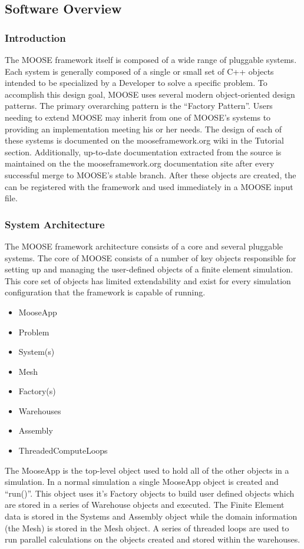 \documentclass{INLreport}
\begin{document}
\subsection{Software Overview}

\subsubsection{Introduction}
The MOOSE framework itself is composed of a wide range of pluggable systems. Each system is generally composed of a
single or small set of C++ objects intended to be specialized by a Developer to solve a specific problem. To accomplish
this design goal, MOOSE uses several modern object-oriented design patterns. The primary overarching pattern is the
``Factory Pattern''. Users needing to extend MOOSE may inherit from one of MOOSE's systems to providing an implementation
meeting his or her needs. The design of each of these systems is documented on the mooseframework.org wiki in the Tutorial
section. Additionally, up-to-date documentation extracted from the source is maintained on the the mooseframework.org
documentation site after every successful merge to MOOSE's stable branch. After these objects are created, the can be
registered with the framework and used immediately in a MOOSE input file.

\subsubsection{System Architecture}
The MOOSE framework architecture consists of a core and several pluggable systems. The core of MOOSE consists of a number
of key objects responsible for setting up and managing the user-defined objects of a finite element simulation. This core
set of objects has limited extendability and exist for every simulation configuration that the framework is capable of running.

\begin{itemize}
\item MooseApp
\item Problem
\item System(s)
\item Mesh
\item Factory(s)
\item Warehouses
\item Assembly
\item ThreadedComputeLoops
\end{itemize}

The MooseApp is the top-level object used to hold all of the other objects in a simulation. In a normal simulation a single
MooseApp object is created and ``run()''. This object uses it's Factory objects to build user defined objects which are stored
in a series of Warehouse objects and executed. The Finite Element data is stored in the Systems and Assembly object while the
domain information (the Mesh) is stored in the Mesh object. A series of threaded loops are used to run parallel calculations
on the objects created and stored within the warehouses.
\end{document}
